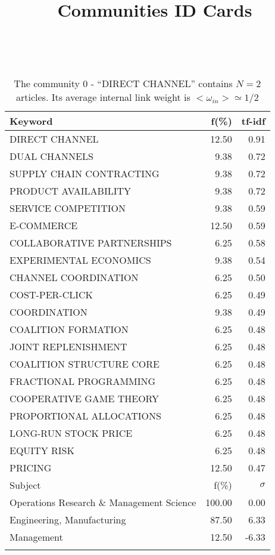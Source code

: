 \documentclass[a4paper,11pt]{report}
\title{{\bf Communities ID Cards}}
\date{\begin{flushleft}This document gather the ``ID Cards'' of the CC communities found within your database.\\
 The CC network was built by keeping a link between articles sharing at least 5 references. The communities characterized here correspond to the ones found in the level 0 (in the sense of the Louvain algo) which gathers more than 0 articles.\\
 These ID cards displays the most frequent keywords, subject categories, journals of publication, institution, countries, authors, references and reference journals of the articles of each community. The significance of an item $\sigma = \sqrt{N} (f - p) / \sqrt{p(1-p)}$ [where $N$ is the number of articles within the community and $f$ and $p$ are the proportion of articles respectively within the community and within the database displaying that item ] is also given (for example $\sigma > 5$ is really highly significant). The tf-idf value which can be calculated by $tf-idf = f*log(frac{1}{p})$ is also given.\\
\vspace{1cm}
\copyright Sebastian Grauwin, Liu Weizhi - (2014) \end{flushleft}}
\begin{document}
\begin{landscape}
\maketitle
\clearpage

\begin{table}[!ht]
\caption{The community 0 - ``DIRECT CHANNEL'' contains $N = 2$ articles. Its average internal link weight is $<\omega_{in}> \simeq 1/2$ }
\textcolor{white}{aa}\\
{\scriptsize\begin{tabular}{|l r  r|}
\hline
Keyword & f(\%) & tf-idf \\
\hline
DIRECT CHANNEL & 12.50 & 0.91\\
DUAL CHANNELS & 9.38 & 0.72\\
SUPPLY CHAIN CONTRACTING & 9.38 & 0.72\\
PRODUCT AVAILABILITY & 9.38 & 0.72\\
SERVICE COMPETITION & 9.38 & 0.59\\
E-COMMERCE & 12.50 & 0.59\\
COLLABORATIVE PARTNERSHIPS & 6.25 & 0.58\\
EXPERIMENTAL ECONOMICS & 9.38 & 0.54\\
CHANNEL COORDINATION & 6.25 & 0.50\\
COST-PER-CLICK & 6.25 & 0.49\\
COORDINATION & 9.38 & 0.49\\
COALITION FORMATION & 6.25 & 0.48\\
JOINT REPLENISHMENT & 6.25 & 0.48\\
COALITION STRUCTURE CORE & 6.25 & 0.48\\
FRACTIONAL PROGRAMMING & 6.25 & 0.48\\
COOPERATIVE GAME THEORY & 6.25 & 0.48\\
PROPORTIONAL ALLOCATIONS & 6.25 & 0.48\\
LONG-RUN STOCK PRICE & 6.25 & 0.48\\
EQUITY RISK & 6.25 & 0.48\\
PRICING & 12.50 & 0.47\\
\hline
\hline
Subject & f(\%) & $\sigma$\\
\hline
Operations Research \& Management Science & 100.00 & 0.00\\
Engineering, Manufacturing & 87.50 & 6.33\\
Management & 12.50 & -6.33\\
 &  & \\

\end{tabular}}
\end{table}
\end{landscape}
\end{document}
